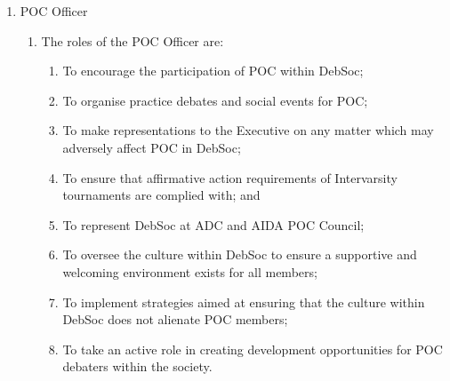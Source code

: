 \begin{enumerate}
\item POC Officer
  \begin{enumerate}
  \item The roles of the POC Officer are:
    \begin{enumerate}
    \item To encourage the participation of POC within DebSoc;
    \item To organise practice debates and social events for POC;
    \item To make representations to the Executive on any matter which may adversely affect POC in DebSoc;
    \item To ensure that affirmative action requirements of Intervarsity tournaments are complied with; and
    \item To represent DebSoc at ADC and AIDA POC Council;
    \item To oversee the culture within DebSoc to ensure a supportive and welcoming environment exists for all members;
    \item To implement strategies aimed at ensuring that the culture within DebSoc does not alienate POC members;
    \item To take an active role in creating development opportunities for POC debaters within the society.
    \end{enumerate}
  \end{enumerate}

\end{enumerate}

